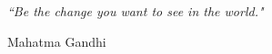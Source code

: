 \documentclass[11pt, oneside]{Thesis} %
\begin{document}
\pagestyle{empty} %

\null\vfill %

\textit{``Be the change you want to see in the world."}

\begin{flushright}
Mahatma Gandhi
\end{flushright}

\vfill\vfill\vfill\vfill\vfill\vfill\null %

\clearpage %


\end{document}
